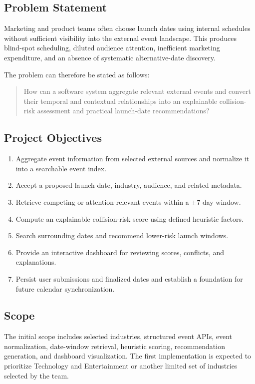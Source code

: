 \documentclass[12pt]{article}
\begin{document}
\subsection{Problem Statement}
Marketing and product teams often choose launch dates using internal schedules without sufficient visibility into the external event landscape. This produces blind-spot scheduling, diluted audience attention, inefficient marketing expenditure, and an absence of systematic alternative-date discovery.

The problem can therefore be stated as follows:

\begin{quote}
How can a software system aggregate relevant external events and convert their temporal and contextual relationships into an explainable collision-risk assessment and practical launch-date recommendations?
\end{quote}

\subsection{Project Objectives}
\begin{enumerate}[leftmargin=0.7cm]
\item Aggregate event information from selected external sources and normalize it into a searchable event index.
\item Accept a proposed launch date, industry, audience, and related metadata.
\item Retrieve competing or attention-relevant events within a $\pm 7$ day window.
\item Compute an explainable collision-risk score using defined heuristic factors.
\item Search surrounding dates and recommend lower-risk launch windows.
\item Provide an interactive dashboard for reviewing scores, conflicts, and explanations.
\item Persist user submissions and finalized dates and establish a foundation for future calendar synchronization.
\end{enumerate}

\subsection{Scope}
The initial scope includes selected industries, structured event APIs, event normalization, date-window retrieval, heuristic scoring, recommendation generation, and dashboard visualization. The first implementation is expected to prioritize Technology and Entertainment or another limited set of industries selected by the team.
\end{document}
